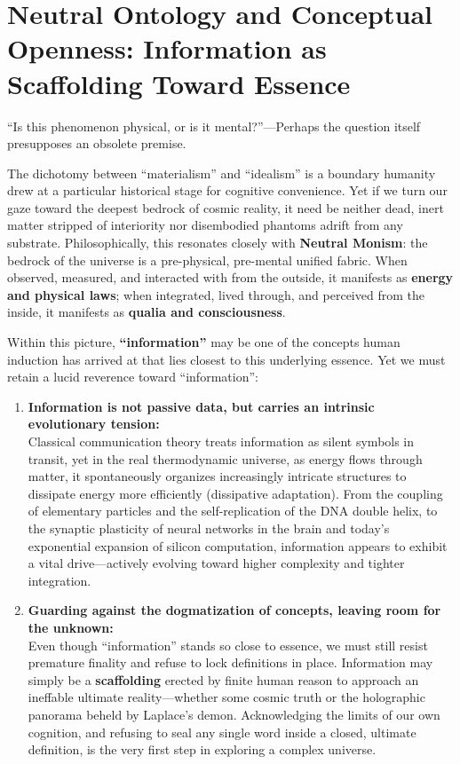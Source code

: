 \documentclass[11pt,a4paper]{article}
\begin{document}
\section{Neutral Ontology and Conceptual Openness: Information as Scaffolding Toward Essence}

``Is this phenomenon physical, or is it mental?''---Perhaps the question itself presupposes an obsolete premise.

The dichotomy between ``materialism'' and ``idealism'' is a boundary humanity drew at a particular historical stage for cognitive convenience. Yet if we turn our gaze toward the deepest bedrock of cosmic reality, it need be neither dead, inert matter stripped of interiority nor disembodied phantoms adrift from any substrate. Philosophically, this resonates closely with \textbf{Neutral Monism}: the bedrock of the universe is a pre-physical, pre-mental unified fabric. When observed, measured, and interacted with from the outside, it manifests as \textbf{energy and physical laws}; when integrated, lived through, and perceived from the inside, it manifests as \textbf{qualia and consciousness}.

Within this picture, \textbf{``information''} may be one of the concepts human induction has arrived at that lies closest to this underlying essence. Yet we must retain a lucid reverence toward ``information'':

\begin{enumerate}[leftmargin=1.8em, itemsep=0.5em]
    \item \textbf{Information is not passive data, but carries an intrinsic evolutionary tension:}\\
    Classical communication theory treats information as silent symbols in transit, yet in the real thermodynamic universe, as energy flows through matter, it spontaneously organizes increasingly intricate structures to dissipate energy more efficiently (dissipative adaptation). From the coupling of elementary particles and the self-replication of the DNA double helix, to the synaptic plasticity of neural networks in the brain and today's exponential expansion of silicon computation, information appears to exhibit a vital drive---actively evolving toward higher complexity and tighter integration.

    \item \textbf{Guarding against the dogmatization of concepts, leaving room for the unknown:}\\
    Even though ``information'' stands so close to essence, we must still resist premature finality and refuse to lock definitions in place. Information may simply be a \textbf{scaffolding} erected by finite human reason to approach an ineffable ultimate reality---whether some cosmic truth or the holographic panorama beheld by Laplace's demon. Acknowledging the limits of our own cognition, and refusing to seal any single word inside a closed, ultimate definition, is the very first step in exploring a complex universe.
\end{enumerate}
\end{document}
